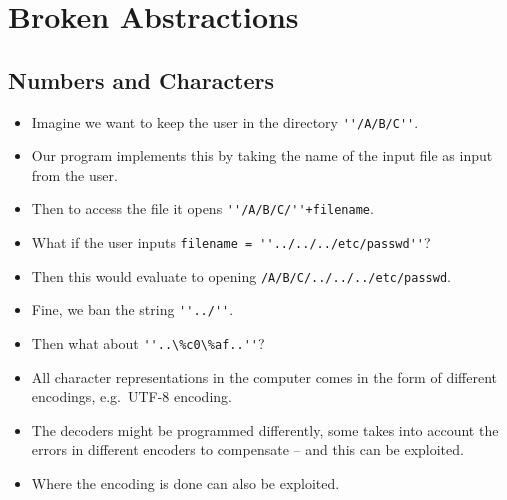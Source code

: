 \documentclass{beamer}
\newcommand{\code}[2][style=code]{\lstinline[#1]`#2`}
\begin{document}
\section{Broken Abstractions}

\subsection{Numbers and Characters}

\begin{frame}{\insertsubsectionhead}
  \begin{itemize}
    \item Imagine we want to keep the user in the directory \code{''/A/B/C''}.

    \item Our program implements this by taking the name of the input file as 
      input from the user.

    \item Then to access the file it opens \code{''/A/B/C/''+filename}.

    \item What if the user inputs \code{filename = ''../../../etc/passwd''}?

    \item Then this would evaluate to opening 
      \code{/A/B/C/../../../etc/passwd}.
  \end{itemize}
\end{frame}

\begin{frame}{\insertsubsectionhead}
  \begin{itemize}
    \item Fine, we ban the string \code{''../''}.

    \item Then what about \code{''..\%c0\%af..''}?

  \end{itemize}
\end{frame}

\begin{frame}{\insertsubsectionhead}
  \begin{itemize}
    \item All character representations in the computer comes in the form of 
      different encodings, e.g.\ UTF-8 encoding.

    \item The decoders might be programmed differently, some takes into account 
      the errors in different encoders to compensate -- and this can be 
      exploited.

    \item Where the encoding is done can also be exploited.

  \end{itemize}
\end{frame}
\end{document}
